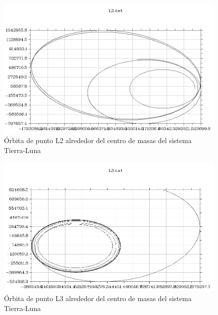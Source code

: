 \documentclass{article}
\begin{document}
	\begin{figure}[h!]
		\begin{center}
			\includegraphics[scale=0.5]{l2.png}
			\caption{Órbita de punto L2 alrededor del centro de masas del sistema Tierra-Luna}
		\end{center}
	\end{figure}

	\newpage

	\begin{figure}[h!]
		\begin{center}
			\includegraphics[scale=0.5]{l3.png}
			\caption{Órbita de punto L3 alrededor del centro de masas del sistema Tierra-Luna}
		\end{center}
	\end{figure}
\end{document}
